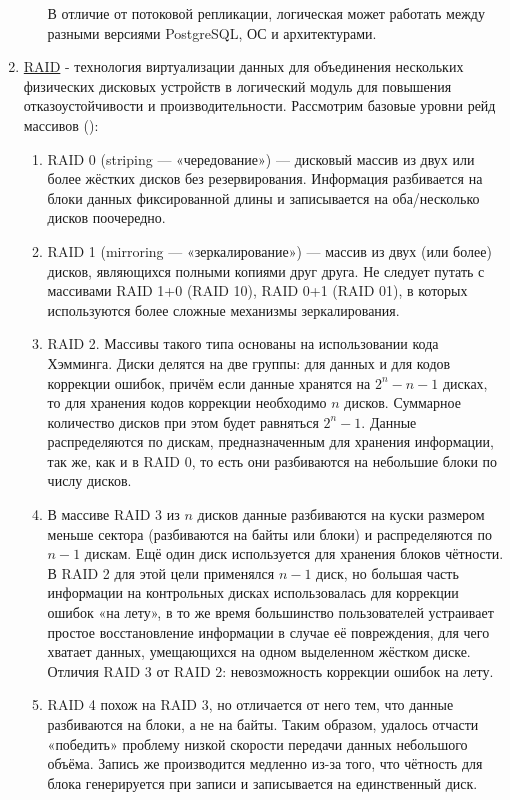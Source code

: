 \begin{enumerate}
\begin{itemize}
В отличие от потоковой репликации, логическая может работать между разными версиями PostgreSQL, ОС и архитектурами.
	\end{itemize}
     \item \underline{RAID} - технология виртуализации данных для объединения нескольких физических дисковых устройств в логический модуль для повышения отказоустойчивости и производительности.
     Рассмотрим базовые уровни рейд массивов (\autocite{Patterson}):
     \begin{enumerate}
         \item RAID 0 (striping — «чередование») — дисковый массив из двух или более жёстких дисков без резервирования. Информация разбивается на блоки данных фиксированной длины и записывается на оба/несколько дисков поочередно.
         \item RAID 1 (mirroring — «зеркалирование») — массив из двух (или более) дисков, являющихся полными копиями друг друга. Не следует путать с массивами RAID 1+0 (RAID 10), RAID 0+1 (RAID 01), в которых используются более сложные механизмы зеркалирования.
         \item RAID 2. Массивы такого типа основаны на использовании кода Хэмминга. Диски делятся на две группы: для данных и для кодов коррекции ошибок, причём если данные хранятся на $2 ^ n - n - 1$ дисках, то для хранения кодов коррекции необходимо $n$ дисков. Суммарное количество дисков при этом будет равняться $2 ^ n - 1$. Данные распределяются по дискам, предназначенным для хранения информации, так же, как и в RAID 0, то есть они разбиваются на небольшие блоки по числу дисков.
         \item В массиве RAID 3 из $n$ дисков данные разбиваются на куски размером меньше сектора (разбиваются на байты или блоки) и распределяются по $n - 1$ дискам. Ещё один диск используется для хранения блоков чётности. В RAID 2 для этой цели применялся $n - 1$ диск, но большая часть информации на контрольных дисках использовалась для коррекции ошибок «на лету», в то же время большинство пользователей устраивает простое восстановление информации в случае её повреждения, для чего хватает данных, умещающихся на одном выделенном жёстком диске. \\ Отличия RAID 3 от RAID 2: невозможность коррекции ошибок на лету.
         \item RAID 4 похож на RAID 3, но отличается от него тем, что данные разбиваются на блоки, а не на байты. Таким образом, удалось отчасти «победить» проблему низкой скорости передачи данных небольшого объёма. Запись же производится медленно из-за того, что чётность для блока генерируется при записи и записывается на единственный диск.

\end{enumerate}
\end{enumerate}
